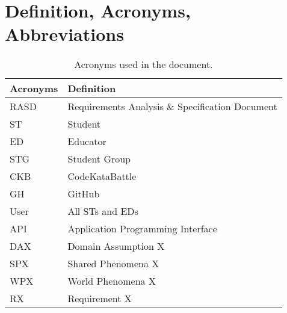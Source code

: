\section{Definition, Acronyms, Abbreviations}
\label{sec:definition_acronyms_abbreviations}%
\begin{table}[H]
    \begin{center}
        \begin{tabular}{ |l|l| }
            \hline
            \textbf{Acronyms} & \textbf{Definition}                              \\
            \hline
            RASD             & Requirements Analysis \& Specification Document                      \\
            \hline
            ST              & Student                         \\
            \hline
            ED              & Educator                         \\
            \hline
            STG             & Student Group                    \\
            \hline
            CKB             & CodeKataBattle                   \\
            \hline
            GH              & GitHub                           \\
            \hline
            User            & All STs and EDs                           \\
            \hline
            API             & Application Programming Interface                           \\
            \hline
            DAX             & Domain Assumption X                           \\
            \hline
            SPX             & Shared Phenomena X                           \\
            \hline
            WPX             & World Phenomena X                           \\
            \hline
            RX              & Requirement X                           \\
            \hline
         \end{tabular}
        \caption{Acronyms used in the document.}
        \label{tab:acronyms}%
    \end{center}
\end{table}




